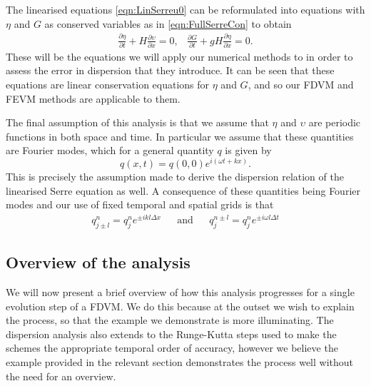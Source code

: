 The linearised equations \eqref{eqn:LinSerreu0} can be reformulated into equations with $\eta$ and $G$ as conserved variables as in \eqref{eqn:FullSerreCon} to obtain
\begin{subequations}
	\begin{gather}
	\label{eqn:LinContG}
	\frac{\partial  \eta}{\partial  t} + H\frac{\partial  \upsilon}{\partial  x} = 0,
	\end{gather}
	
	\begin{gather}
	\label{eqn:LineMomeG}
	\frac{\partial  G}{\partial  t} + g H \frac{\partial  \eta}{\partial  x}  = 0.
	\end{gather}
	\label{eqn:LinSerreG}	
\end{subequations}
These will be the equations we will apply our numerical methods to in order to assess the error in dispersion that they introduce. It can be seen that these equations are linear conservation equations for $\eta$ and $G$, and so our FDVM and FEVM methods are applicable to them.

The final assumption of this analysis is that we assume that $\eta$ and $\upsilon$ are periodic functions in both space and time. In particular we assume that these quantities are Fourier modes, which for a general quantity $q$ is given by
\begin{equation}
q(x,t) = q(0,0) e^{i\left(\omega t + kx\right)}.
\label{eqn:FourierNode}
\end{equation}
This is precisely the assumption made to derive the dispersion relation of the linearised Serre equation as well. A consequence of these quantities being Fourier modes and our use of fixed temporal and spatial grids is that
\begin{align}
q^{n}_{j \pm l} = q^n_j e^{\pm ik l\Delta x} & & \text{and} & & q^{n \pm l}_{j} = q^n_j e^{\pm i \omega l\Delta t}
\label{eqn:fourierfactor}
\end{align}



\subsection{Overview of the analysis}
We will now present a brief overview of how this analysis progresses for a single evolution step of a FDVM. We do this because at the outset we wish to explain the process, so that the example we demonstrate is more illuminating. The dispersion analysis also extends to the Runge-Kutta steps used to make the schemes the appropriate temporal order of accuracy, however we believe the example provided in the relevant section demonstrates the process well without the need for an overview.


